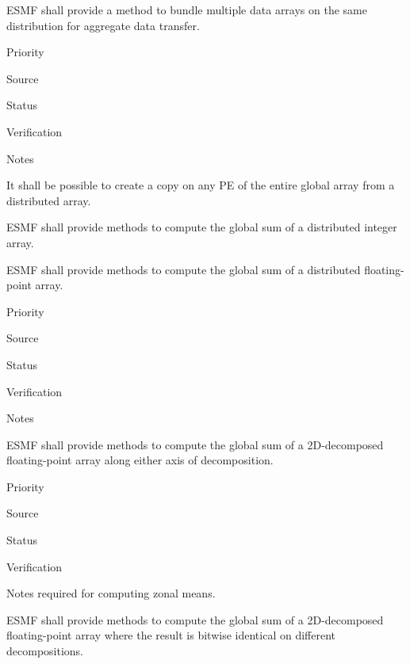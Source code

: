 
ESMF shall provide a method to bundle multiple data arrays on the same
distribution for aggregate data transfer.

\begin{reqlist}
\item[Priority]
\item[Source]
\item[Status]
\item[Verification]
\item[Notes]
\end{reqlist}


It shall be possible to create a copy on any PE of the entire global
array from a distributed array.



ESMF shall provide methods to compute the global sum of a distributed
integer array.


ESMF shall provide methods to compute the global sum of a distributed
floating-point array.

\begin{reqlist}
\item[Priority]
\item[Source]
\item[Status]
\item[Verification]
\item[Notes]
\end{reqlist}


ESMF shall provide methods to compute the global sum of a 2D-decomposed
floating-point array along either axis of decomposition.

\begin{reqlist}
\item[Priority]
\item[Source]
\item[Status]
\item[Verification]
\item[Notes] required for computing zonal means.
\end{reqlist}


ESMF shall provide methods to compute the global sum of a
2D-decomposed floating-point array where the result is bitwise
identical on different decompositions.

